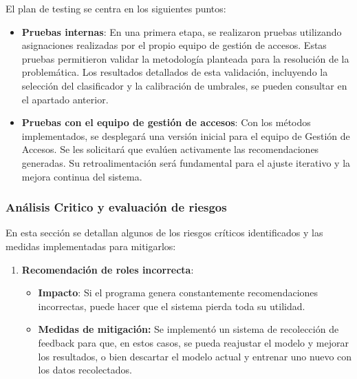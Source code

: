 \documentclass[11pt,letterpaper]{article}
\begin{document}
\begin{itemize}
El plan de testing se centra en los siguientes puntos:

\begin{itemize}
\tightlist
\item
  \textbf{Pruebas internas}: En una primera etapa, se realizaron pruebas
  utilizando asignaciones realizadas por el propio equipo de gestión de
  accesos. Estas pruebas permitieron validar la metodología planteada
  para la resolución de la problemática. Los resultados detallados de
  esta validación, incluyendo la selección del clasificador y la
  calibración de umbrales, se pueden consultar en el apartado anterior.
\item
  \textbf{Pruebas con el equipo de gestión de accesos}: Con los métodos
  implementados, se desplegará una versión inicial para el equipo de
  Gestión de Accesos. Se les solicitará que evalúen activamente las
  recomendaciones generadas. Su retroalimentación será fundamental para
  el ajuste iterativo y la mejora continua del sistema.
\end{itemize}

\hypertarget{anuxe1lisis-critico-y-evaluaciuxf3n-de-riesgos}{%
\subsubsection{Análisis Critico y evaluación de
riesgos}\label{anuxe1lisis-critico-y-evaluaciuxf3n-de-riesgos}}

En esta sección se detallan algunos de los riesgos críticos
identificados y las medidas implementadas para mitigarlos:

\begin{enumerate}
\def\labelenumi{\arabic{enumi}.}
\tightlist
\item
  \textbf{Recomendación de roles incorrecta}:

  \begin{itemize}
  \tightlist
  \item
    \textbf{Impacto}: Si el programa genera constantemente
    recomendaciones incorrectas, puede hacer que el sistema pierda toda
    su utilidad.
  \item
    \textbf{Medidas de mitigación:} Se implementó un sistema de
    recolección de feedback para que, en estos casos, se pueda reajustar
    el modelo y mejorar los resultados, o bien descartar el modelo
    actual y entrenar uno nuevo con los datos recolectados.
  \end{itemize}
\end{enumerate}




\end{itemize}
\end{document}
